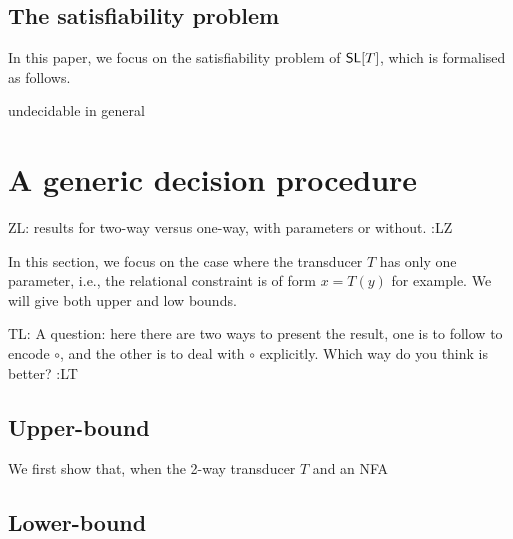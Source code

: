 \documentclass{llncs}
\newcommand{\zhilin}[1]{\color{brown} {ZL: #1 :LZ} \color{black}}
\newcommand{\tl}[1]{\color{blue} {TL: #1 :LT} \color{black}}
\newcommand{\zhilin}[1]{}
\newcommand{\tl}[1]{}
\newcommand{\concat} {\circ}
\begin{document}
\subsection{The satisfiability problem} \label{sec-sat}
In this paper, we focus on the satisfiability problem of $\mathsf{SL}[T]$, which is formalised as follows.


\begin{quote} \centering
\end{quote}
\smallskip



\begin{proposition}
undecidable in general
\end{proposition}

\section{A generic decision procedure}

\zhilin{results for two-way versus one-way, with parameters or without.}

In this section, we focus on the case where the transducer $T$ has only one parameter, i.e., the relational constraint is of form $x=T(y)$ for example. We will give both upper and low bounds.

\tl{A question: here there are two ways to present the result, one is to follow \cite{LB16} to encode $\concat$, and the other is to deal with $\concat$ explicitly. Which way do you think is better?}

\subsection{Upper-bound}
We first show that, when the 2-way transducer $T$ and an NFA


\subsection{Lower-bound}
\end{document}
